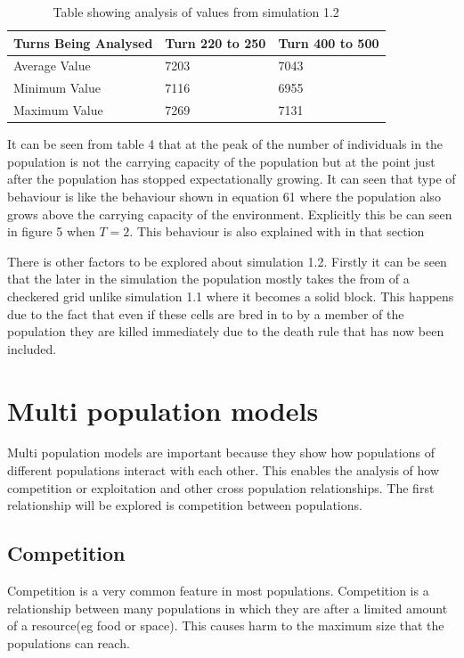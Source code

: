 \documentclass[final]{cmpreport}
\begin{document}
	\begin{table}[h!]
		\centering
		\caption{Table showing analysis of values from simulation 1.2}
		\begin{tabular}{|l|l|l|}
			\hline
			Turns Being Analysed &  Turn 220 to 250	&Turn 400 to 500 \\
			\hline
			Average Value        & 7203  		   	& 7043           \\
			Minimum Value        & 7116   			& 6955           \\
			Maximum Value        & 7269  			& 7131            \\
			\hline
		\end{tabular}
	\end{table}
	
	
	It can be seen from table 4 that at the peak of the number of individuals in the population is not the carrying capacity of the population but at the point just after the population has stopped expectationally growing. It can seen that type of behaviour is like the behaviour  shown in equation 61 where the population also grows above the carrying capacity of the environment. Explicitly this be can seen in figure 5 when $T=2$. This behaviour is also explained with in that section
	
	There is other factors to be explored about simulation 1.2. Firstly it can be seen that the later in the simulation the population mostly takes the from of a checkered grid unlike simulation 1.1 where it becomes a solid block. This happens due to the fact that even if these cells are bred in to by a member of the population they are killed immediately due to the death rule that has now been included.
	

\section{Multi population models}

	

	Multi population models are important because they show how populations of different populations interact with each other. This enables the analysis of how competition or exploitation and other cross population relationships. The first relationship  will be explored is competition between populations.
	
	\subsection{Competition}
		Competition is a very common feature in most populations. Competition is a relationship between many populations in which they are after a limited amount of a resource(eg food or space). This causes harm to the maximum size that the populations can reach.
		
\end{document}
